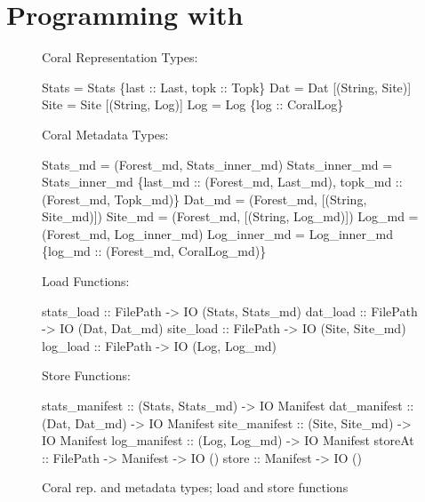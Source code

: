 \section{Programming with \forest{}}
\label{sec:exp}

\begin{figure}
%
Coral Representation Types:
\begin{code}
 Stats = Stats \{last :: Last, topk :: Topk\}
 Dat   = Dat   [(String, Site)]
 Site  = Site  [(String, Log)]
    Log   = Log   \{log :: CoralLog\}
\end{code}
%
Coral Metadata Types:
\begin{code}
 Stats_md = (Forest_md, Stats_inner_md)
 Stats_inner_md = Stats_inner_md 
    \{last_md :: (Forest_md, Last_md),
     topk_md :: (Forest_md, Topk_md)\}
 Dat_md   = (Forest_md, [(String, Site_md)])
 Site_md  = (Forest_md, [(String, Log_md)])
 Log_md   = (Forest_md, Log_inner_md)
 Log_inner_md = Log_inner_md 
    \{log_md :: (Forest_md, CoralLog_md)\}
\end{code}
Load Functions:
\begin{code}
stats_load :: FilePath -> IO (Stats, Stats_md)
dat_load   :: FilePath -> IO (Dat, Dat_md)
site_load  :: FilePath -> IO (Site, Site_md)
log_load   :: FilePath -> IO (Log, Log_md)
\end{code}
Store Functions:
\begin{code}
stats_manifest :: (Stats, Stats_md) -> IO Manifest
dat_manifest   :: (Dat, Dat_md)     -> IO Manifest
site_manifest  :: (Site, Site_md)   -> IO Manifest
log_manifest   :: (Log, Log_md)     -> IO Manifest\smallskip
storeAt        :: FilePath -> Manifest -> IO ()
store          ::             Manifest -> IO ()
\end{code}
\caption{Coral rep. and metadata types; load and store functions}
\label{fig:coral-aux}
\end{figure}

